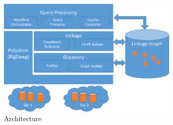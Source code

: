 \begin{figure}
\includegraphics[width=3.5in]{arch3.pdf}
\caption{\dcv Architecture}
\label{fig:arch}
\end{figure}


%
%
%    
%
